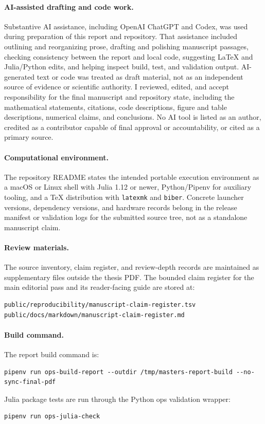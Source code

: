 \paragraph*{AI-assisted drafting and code work.}
Substantive AI assistance, including OpenAI ChatGPT and Codex, was used during
preparation of this report and repository. That assistance included outlining
and reorganizing prose, drafting and polishing manuscript passages, checking
consistency between the report and local code, suggesting \LaTeX{} and
Julia/Python edits, and helping inspect build, test, and validation output.
AI-generated text or code was treated as draft material, not as an independent
source of evidence or scientific authority. I reviewed, edited, and accept
responsibility for the final manuscript and repository state, including the
mathematical statements, citations, code descriptions, figure and table
descriptions, numerical claims, and conclusions. No AI tool is listed as an
author, credited as a contributor capable of final approval or accountability,
or cited as a primary source.

\paragraph*{Computational environment.}
The repository README states the intended portable execution environment as a macOS
or Linux shell with Julia 1.12 or newer, Python/Pipenv for auxiliary tooling,
and a TeX distribution with \texttt{latexmk} and \texttt{biber}. Concrete
launcher versions, dependency versions, and hardware records belong in the
release manifest or validation logs for the submitted source tree, not as a
standalone manuscript claim.

\paragraph*{Review materials.}
The source inventory, claim register, and review-depth records are maintained as
supplementary files outside the thesis PDF. The bounded claim register for the
main editorial pass and its reader-facing guide are stored at:
\begin{lstlisting}[basicstyle=\ttfamily\footnotesize,breaklines=true]
public/reproducibility/manuscript-claim-register.tsv
public/docs/markdown/manuscript-claim-register.md
\end{lstlisting}

\paragraph*{Build command.}
The report build command is:
\begin{lstlisting}[basicstyle=\ttfamily\footnotesize,breaklines=true]
pipenv run ops-build-report --outdir /tmp/masters-report-build --no-sync-final-pdf
\end{lstlisting}
Julia package tests are run through the Python ops validation wrapper:
\begin{lstlisting}[basicstyle=\ttfamily\footnotesize,breaklines=true]
pipenv run ops-julia-check
\end{lstlisting}

